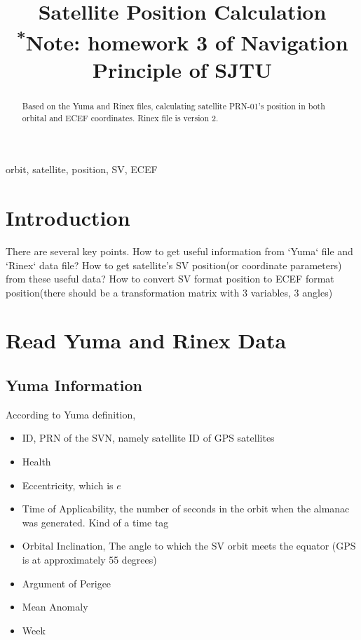 \documentclass[conference]{IEEEtran}
\begin{document}
\title{Satellite Position Calculation\\
{\footnotesize \textsuperscript{*}Note:
homework 3 of Navigation Principle of SJTU}
}

\author{
}

\maketitle

\begin{abstract}
Based on the Yuma and Rinex files, calculating satellite PRN-01’s position in both orbital and ECEF coordinates. Rinex file is version 2.
\end{abstract}

\begin{IEEEkeywords}
orbit, satellite, position, SV, ECEF
\end{IEEEkeywords}

\section{Introduction}
There are several key points. How to get useful information from `Yuma` file and `Rinex` data file? How to get satellite's SV position(or coordinate parameters) from these useful data? How to convert SV format position to ECEF format position(there should be a transformation matrix with 3 variables, 3 angles)

\section{Read Yuma and Rinex Data}

\subsection{Yuma Information}

According to Yuma definition,
\begin{itemize}
	\item ID, PRN of the SVN, namely satellite ID of GPS satellites
	\item Health
	\item Eccentricity, which is $e$
	\item Time of Applicability, the number of seconds in the orbit when the almanac was generated. Kind of a time tag
	\item Orbital Inclination, The angle to which the SV orbit meets the equator (GPS is at approximately 55 degrees)
	\item Argument of Perigee
	\item Mean Anomaly
	\item Week
\end{itemize}
\end{document}
